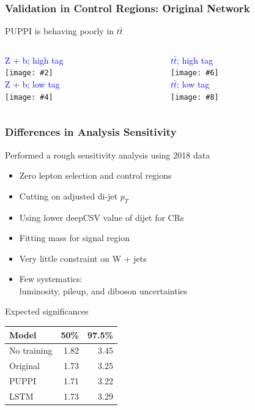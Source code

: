 \documentclass{beamer}
\newcommand{\fourfigs}[8]{
  \begin{columns}
    \begin{column}{0.3\linewidth}
      \centering
      \textcolor{blue}{#1} \\
      \texttt{[image: \#2]} \\
      \textcolor{blue}{#3} \\
      \texttt{[image: \#4]}
    \end{column}
    \begin{column}{0.3\linewidth}
      \centering
      \textcolor{blue}{#5} \\
      \texttt{[image: \#6]} \\
      \textcolor{blue}{#7} \\
      \texttt{[image: \#8]}
    \end{column}
  \end{columns}
}
\begin{document}
\begin{frame}
  \frametitle{Validation in Control Regions: Original Network}

  PUPPI is behaving poorly in $t\bar{t}$

  \fourfigs{Z + b; high tag}
           {190813_validation/heavyz_jet1_tf_190723_puppi_ptratio.pdf}
           {Z + b; low tag}
           {190813_validation/heavyz_jet2_tf_190723_puppi_ptratio.pdf}
           {$t\bar{t}$; high tag}
           {190813_validation/tt_jet1_tf_190723_puppi_ptratio.pdf}
           {$t\bar{t}$; low tag}
           {190813_validation/tt_jet2_tf_190723_puppi_ptratio.pdf}

\end{frame}


\begin{frame}
  \frametitle{Differences in Analysis Sensitivity}

  Performed a rough sensitivity analysis using 2018 data

  \begin{itemize}
  \item Zero lepton selection and control regions
  \item Cutting on adjusted di-jet $p_T$
  \item Using lower deepCSV value of dijet for CRs
  \item Fitting mass for signal region
  \item Very little constraint on W + jets
  \item Few systematics: \\ luminosity, pileup, and diboson uncertainties
  \end{itemize}

  Expected significances

  \centering
  \begin{tabular}{l | r | r}
    Model & 50\% & 97.5\% \\
    \hline
    No training & 1.82 & 3.45 \\
    Original & 1.73 & 3.25 \\
    PUPPI & 1.71 & 3.22 \\
    LSTM & 1.73 & 3.29
  \end{tabular}

\end{frame}
\end{document}
